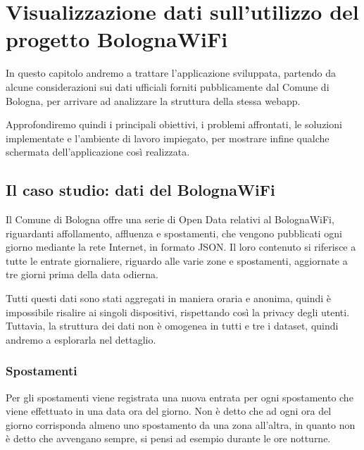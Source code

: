 \clearpage{\pagestyle{empty}\cleardoublepage}
\chapter{Visualizzazione dati sull'utilizzo del progetto BolognaWiFi}
In questo capitolo andremo a trattare l'applicazione sviluppata, partendo da alcune considerazioni sui dati ufficiali forniti pubblicamente dal Comune di Bologna, per arrivare ad analizzare la struttura della stessa webapp.

Approfondiremo quindi i principali obiettivi, i problemi affrontati, le soluzioni implementate e l'ambiente di lavoro impiegato, per mostrare infine qualche schermata dell'applicazione così realizzata.

\section{Il caso studio: dati del BolognaWiFi}
Il Comune di Bologna offre una serie di Open Data relativi al BolognaWiFi, riguardanti affollamento, affluenza e spostamenti, che vengono pubblicati ogni giorno mediante la rete Internet, in formato JSON. Il loro contenuto si riferisce a tutte le entrate giornaliere, riguardo alle varie zone e spostamenti, aggiornate a tre giorni prima della data odierna.


Tutti questi dati sono stati aggregati in maniera oraria e anonima, quindi è impossibile risalire ai singoli dispositivi, rispettando così la privacy degli utenti. Tuttavia, la struttura dei dati non è omogenea in tutti e tre i dataset, quindi andremo a esplorarla nel dettaglio.

\subsection{Spostamenti}
Per gli spostamenti viene registrata una nuova entrata per ogni spostamento che viene effettuato in una data ora del giorno. Non è detto che ad ogni ora del giorno corrisponda almeno uno spostamento da una zona all'altra, in quanto non è detto che avvengano sempre, si pensi ad esempio durante le ore notturne.

